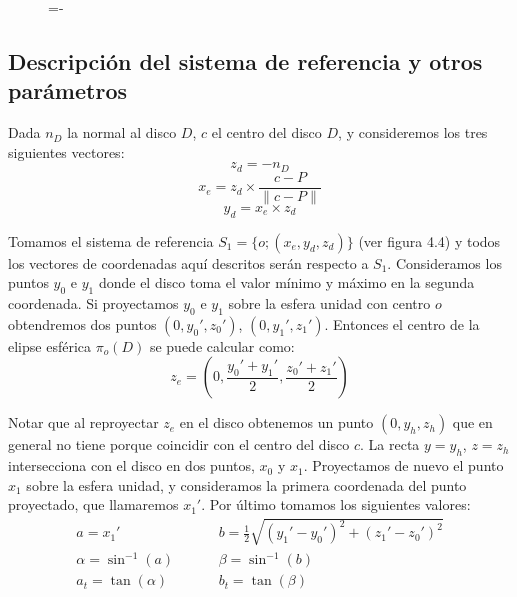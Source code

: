 \begin{figure}[h]
  \lineskip=-\fboxrule
\end{figure}

\subsection{Descripción del sistema de referencia y otros parámetros}

Dada $n_D$ la normal al disco $D$, $c$ el centro del disco $D$, y consideremos los tres siguientes vectores:
$$z_d = -n_D $$
$$x_e = z_d\times \frac{c-P}{\|c-P\|} $$
$$y_d = x_e\times z_d $$

Tomamos el sistema de referencia $S_1=\{o;(x_e, y_d, z_d)\}$ (ver figura 4.4) y todos los vectores de coordenadas aquí descritos serán respecto a $S_1$. Consideramos los puntos $y_0$ e $y_1$ donde el disco toma el valor mínimo y máximo en la segunda coordenada. Si proyectamos $y_0$ e $y_1$ sobre la esfera unidad con centro $o$ obtendremos dos puntos $(0,y_0',z_0')$, $(0,y_1',z_1')$. Entonces el centro de la elipse esférica $\pi_o(D)$ se puede calcular como:
$$z_e = (0,\frac{y_0'+y_1'}{2}, \frac{z_0' + z_1'}{2}) $$

Notar que al reproyectar $z_e$ en el disco obtenemos un punto $(0,y_h,z_h)$ que en general no tiene porque coincidir con el centro del disco $c$. La recta $y = y_h$, $z=z_h$ intersecciona con el disco en dos puntos, $x_0$ y $x_1$. Proyectamos de nuevo el punto $x_1$ sobre la esfera unidad, y consideramos la primera coordenada del punto proyectado, que llamaremos $x_1'$. Por último tomamos los siguientes valores:
\begin{align*}
a = x_1'&\hspace{1cm} b=\frac{1}{2}\sqrt{(y_1'-y_0')^2 + (z_1'-z_0')^2}\\
\alpha = \sin^{-1}(a)&\hspace{1cm} \beta=\sin^{-1}(b)\\
a_t = \tan(\alpha) &\hspace{1cm}b_t=\tan(\beta)
\end{align*}

